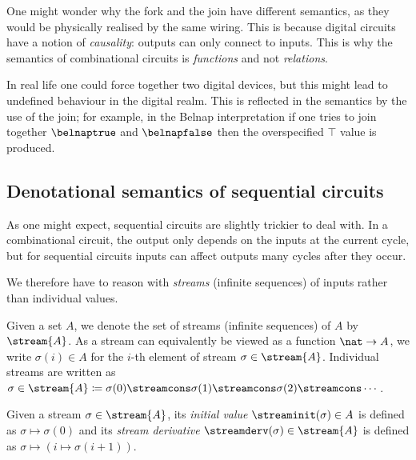 \begin{remark}
    One might wonder why the fork and the join have different semantics, as they
    would be physically realised by the same wiring.
    This is because digital circuits have a notion of \emph{causality}: outputs
    can only connect to inputs.
    This is why the semantics of combinational circuits is \emph{functions} and
    not \emph{relations}.

    In real life one could force together two digital devices, but this might
    lead to undefined behaviour in the digital realm.
    This is reflected in the semantics by the use of the join; for example, in
    the Belnap interpretation if one tries to join together \(\belnaptrue\) and
    \(\belnapfalse\) then the overspecified \(\top\) value is produced.
\end{remark}

\subsection{Denotational semantics of sequential circuits}

As one might expect, sequential circuits are slightly trickier to deal with.
In a combinational circuit, the output only depends on the inputs at the current
cycle, but for sequential circuits inputs can affect outputs many cycles after
they occur.

We therefore have to reason with \emph{streams} (infinite sequences) of inputs
rather than individual values.

\begin{notation}
    Given a set \(A\), we denote the set of streams (infinite sequences) of
    \(A\) by \(\stream{A}\).
    As a stream can equivalently be viewed as a function \(\nat \to A\), we
    write \(\sigma(i) \in A\) for the \(i\)-th element of stream
    \(\sigma \in \stream{A}\).
    Individual streams are written as \(
        \sigma \in \stream{A}
        \coloneqq
        \sigma(0) \streamcons \sigma(1) \streamcons
        \sigma(2) \streamcons \cdots
    \).
\end{notation}

\begin{definition}\label{def:stream-operations}
    Given a stream \(\sigma \in \stream{A}\), its \emph{initial value}
    \(\streaminit(\sigma) \in A\) is defined as \(\sigma \mapsto \sigma(0)\)
    and its \emph{stream derivative} \(\streamderv(\sigma) \in \stream{A}\) is
    defined as \(\sigma \mapsto (i \mapsto \sigma(i+1))\).
\end{definition}

